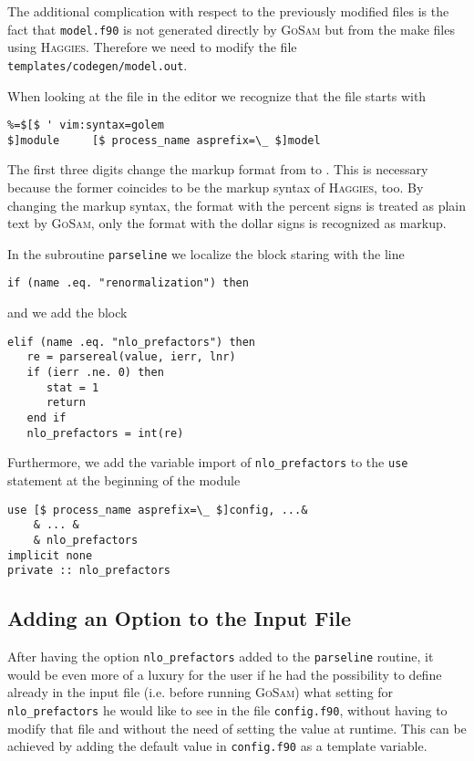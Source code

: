 \documentclass[11pt,a4paper]{refrep}
\newcommand{\golem}{\textsc{GoSam}\xspace}
\newcommand{\haggies}{\textsc{Haggies}\xspace}
\begin{document}
The additional complication with respect to the previously modified
files is the fact that \texttt{model.f90} is not generated directly
by \golem{} but from the make files using \haggies{}. Therefore we
need to modify the file
\texttt{templates/\hspace{0pt}codegen\hspace{0pt}/model.out}.

When looking at the file in the editor we recognize that the file
starts with
\begin{lstlisting}
%=$[$ ' vim:syntax=golem
$]module     [$ process_name asprefix=\_ $]model
\end{lstlisting}
The first three digits \lit{\%=\$} change the markup format from
\lit{[\% ... \%]} to \lit{[\$ ... \$]}. This is necessary because
the former coincides to be the markup syntax of \haggies{}, too.
By changing the markup syntax, the format with the percent signs
is treated as plain text by \golem{}, only the format with the
dollar signs is recognized as markup.

In the subroutine \texttt{parseline} we localize the block staring
with the line
\begin{lstlisting}
if (name .eq. "renormalization") then
\end{lstlisting}
and we add the block
\begin{lstlisting}
elif (name .eq. "nlo_prefactors") then
   re = parsereal(value, ierr, lnr)
   if (ierr .ne. 0) then
      stat = 1
      return
   end if
   nlo_prefactors = int(re)
\end{lstlisting}

Furthermore, we add the variable import of \texttt{nlo\_prefactors}
to the \texttt{use} statement at the beginning of the module
\begin{lstlisting}
use [$ process_name asprefix=\_ $]config, ...&
    & ... &
    & nlo_prefactors
implicit none
private :: nlo_prefactors
\end{lstlisting}

\subsection{Adding an Option to the Input File}
\label{ssec:nlo-prefactors:03}
After having the option \texttt{nlo\_prefactors} added to the
\texttt{parseline} routine,
it would be even more of a luxury for the user if he had the possibility
to define already in the input file (i.e. before running \golem{}) what
setting for \texttt{nlo\_prefactors} he would like to see in the file
\texttt{config.f90}, without having to modify that file and without the
need of setting the value at runtime. This can be achieved by adding
the default value in \texttt{config.f90} as a template variable.
\end{document}
